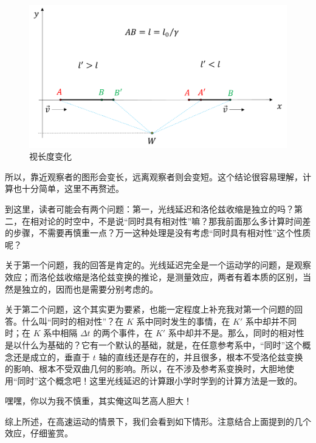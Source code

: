 \documentclass[12pt, a4paper, oneside]{ctexbook}
\begin{document}
\begin{figure}[H]
	\centering
	\includegraphics[scale=0.5]{figures/observing-length.png}
	\caption{视长度变化}
\end{figure}

所以，靠近观察者的图形会变长，远离观察者则会变短。这个结论很容易理解，计算也十分简单，这里不再赘述。

\par   到这里，读者可能会有两个问题：第一，光线延迟和洛伦兹收缩是独立的吗？第二，在相对论的时空中，不是说“同时具有相对性”嘛？那我前面那么多计算时间差的步骤，不需要再慎重一点？万一这种处理是没有考虑“同时具有相对性”这个性质呢？

\par   关于第一个问题，我的回答是肯定的。光线延迟完全是一个运动学的问题，是观察效应；而洛伦兹收缩是洛伦兹变换的推论，是测量效应，两者有着本质的区别，当然是独立的，因而也是需要分别考虑的。

\par   关于第二个问题，这个其实更为要紧，也能一定程度上补充我对第一个问题的回答。什么叫“同时的相对性”？在 $K$ 系中同时发生的事情，在 $K'$ 系中却并不同时；在 $K$ 系中相隔 $\Delta t$ 的两个事件，在 $K'$ 系中却并不是。那么，同时的相对性是以什么为基础的？它有一个默认的基础，就是，在任意参考系中，“同时”这个概念还是成立的，垂直于 $t$ 轴的直线还是存在的，并且很多，根本不受洛伦兹变换的影响、根本不受双曲几何的影响。所以，在不涉及参考系变换时，大胆地使用“同时”这个概念吧！这里光线延迟的计算跟小学时学到的计算方法是一致的。

\par   嘿嘿，你以为我不慎重，其实俺这叫艺高人胆大！

综上所述，在高速运动的情景下，我们会看到如下情形。注意结合上面提到的几个效应，仔细鉴赏。
\end{document}
